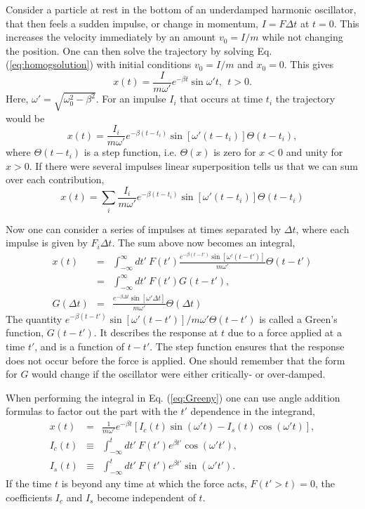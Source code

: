 Consider a particle at rest in the bottom of an underdamped harmonic oscillator, that then feels a sudden impulse, or change in momentum, $I=F\Delta t$ at $t=0$. This increases the velocity immediately by an amount $v_0=I/m$ while not changing the position. One can then solve the trajectory by solving Eq. (\ref{eq:homogsolution}) with initial conditions $v_0=I/m$ and $x_0=0$. This gives
\begin{equation}
x(t)=\frac{I}{m\omega'}e^{-\beta t}\sin\omega't, ~~t>0.
\end{equation}
Here, $\omega'=\sqrt{\omega_0^2-\beta^2}$. For an impulse $I_i$ that occurs at time $t_i$ the trajectory would be
\begin{equation}
x(t)=\frac{I_i}{m\omega'}e^{-\beta (t-t_i)}\sin[\omega'(t-t_i)] \Theta(t-t_i),
\end{equation}
where $\Theta(t-t_i)$ is a step function, i.e. $\Theta(x)$ is zero for $x<0$ and unity for $x>0$. If there were several impulses linear superposition tells us that we can sum over each contribution,
\begin{equation}
x(t)=\sum_i\frac{I_i}{m\omega'}e^{-\beta(t-t_i)}\sin[\omega'(t-t_i)]\Theta(t-t_i)
\end{equation} 

Now one can consider a series of impulses at times separated by $\Delta t$, where each impulse is given by $F_i\Delta t$. The sum above now becomes an integral,
\begin{eqnarray}\label{eq:Greeny}
x(t)&=&\int_{-\infty}^\infty dt'~F(t')\frac{e^{-\beta(t-t')}\sin[\omega'(t-t')]}{m\omega'}\Theta(t-t')\\
\nonumber
&=&\int_{-\infty}^\infty dt'~F(t')G(t-t'),\\
\nonumber
G(\Delta t)&=&\frac{e^{-\beta\Delta t}\sin[\omega' \Delta t]}{m\omega'}\Theta(\Delta t)
\end{eqnarray}
The quantity $e^{-\beta(t-t')}\sin[\omega'(t-t')]/m\omega'\Theta(t-t')$ is called a Green's function, $G(t-t')$. It describes the response at $t$ due to a force applied at a time $t'$, and is a function of $t-t'$. The step function ensures that the response does not occur before the force is applied. One should remember that the form for $G$ would change if the oscillator were either critically- or over-damped.

When performing the integral in Eq. (\ref{eq:Greeny}) one can use angle addition formulas to factor out the part with the $t'$ dependence in the integrand,
\begin{eqnarray}
\label{eq:Greeny2}
x(t)&=&\frac{1}{m\omega'}e^{-\beta t}\left[I_c(t)\sin(\omega't)-I_s(t)\cos(\omega't)\right],\\
\nonumber
I_c(t)&\equiv&\int_{-\infty}^t dt'~F(t')e^{\beta t'}\cos(\omega't'),\\
\nonumber
I_s(t)&\equiv&\int_{-\infty}^t dt'~F(t')e^{\beta t'}\sin(\omega't').
\end{eqnarray}
If the time $t$ is beyond any time at which the force acts, $F(t'>t)=0$, the coefficients $I_c$ and $I_s$ become independent of $t$. 

